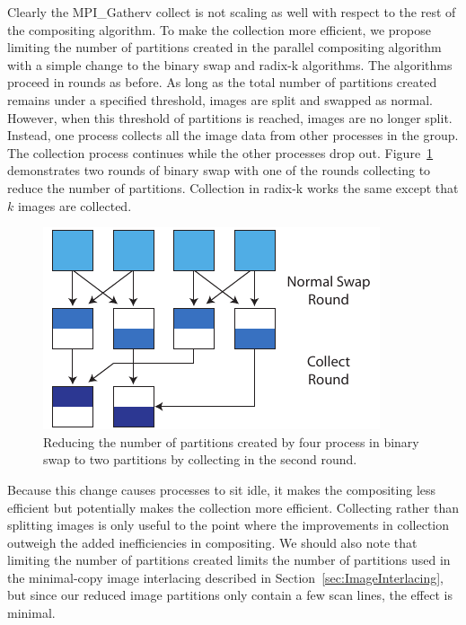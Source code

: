 \documentclass{acm_proc_article-sp}
\begin{document}
Clearly the MPI\_Gatherv collect is not scaling as well with respect to the
rest of the compositing algorithm.  To make the collection more efficient,
we propose limiting the number of partitions created in the parallel
compositing algorithm with a simple change to the binary swap and radix-k
algorithms.  The algorithms proceed in rounds as before.  As long as the
total number of partitions created remains under a specified threshold,
images are split and swapped as normal.  However, when this threshold of
partitions is reached, images are no longer split.  Instead, one process
collects all the image data from other processes in the group.  The
collection process continues while the other processes drop out.
Figure~\ref{fig:CollectRounds} demonstrates two rounds of binary swap with
one of the rounds collecting to reduce the number of partitions.
Collection in radix-k works the same except that $k$ images are collected.

\begin{figure}[htbp]
  \centering
  \includegraphics{images/CollectRounds}
  \caption{Reducing the number of partitions created by four process in
    binary swap to two partitions by collecting in the second round.}
  \label{fig:CollectRounds}
\end{figure}

Because this change causes processes to sit idle, it makes the compositing
less efficient but potentially makes the collection more efficient.
Collecting rather than splitting images is only useful to the point where
the improvements in collection outweigh the added inefficiencies in
compositing.  We should also note that limiting the number of partitions
created limits the number of partitions used in the minimal-copy image
interlacing described in Section~\ref{sec:ImageInterlacing}, but since our
reduced image partitions only contain a few scan lines, the effect is
minimal.
\end{document}
